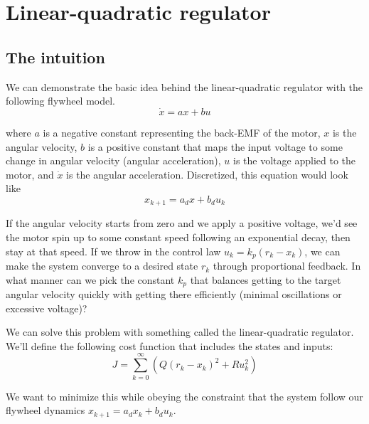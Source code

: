 \section{Linear-quadratic regulator} \label{sec:lqr}

\subsection{The intuition}

We can demonstrate the basic idea behind the linear-quadratic regulator with the
following flywheel model.
\begin{equation*}
  \dot{x} = ax + bu
\end{equation*}

where $a$ is a negative constant representing the back-EMF of the motor, $x$ is
the angular velocity, $b$ is a positive constant that maps the input voltage to
some change in angular velocity (angular acceleration), $u$ is the voltage
applied to the motor, and $\dot{x}$ is the angular acceleration. Discretized,
this equation would look like
\begin{equation*}
  x_{k+1} = a_d x + b_d u_k
\end{equation*}

If the angular velocity starts from zero and we apply a positive voltage, we'd
see the motor spin up to some constant speed following an exponential decay,
then stay at that speed. If we throw in the control law $u_k = k_p(r_k - x_k)$,
we can make the system converge to a desired state $r_k$ through proportional
feedback. In what manner can we pick the constant $k_p$ that balances getting to
the target angular velocity quickly with getting there efficiently (minimal
oscillations or excessive voltage)?

We can solve this problem with something called the linear-quadratic regulator.
We'll define the following cost function that includes the states and inputs:
\begin{equation*}
  J = \sum_{k=0}^\infty (Q(r_k - x_k)^2 + Ru_k^2)
\end{equation*}

We want to minimize this while obeying the constraint that the system follow our
flywheel dynamics $x_{k+1} = a_d x_k + b_d u_k$.

